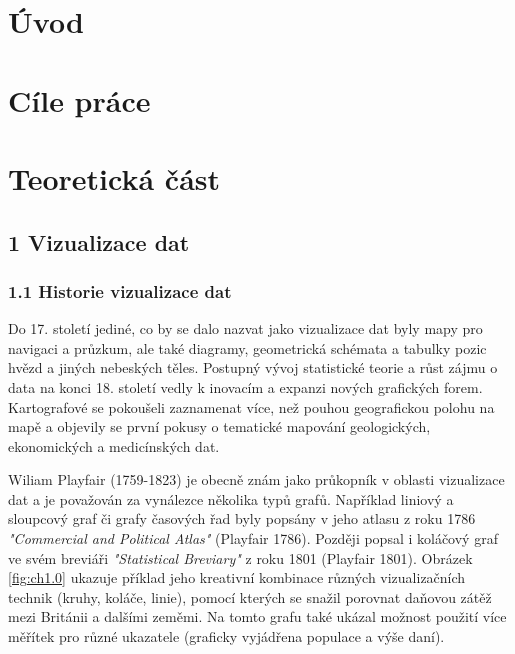\documentclass[12pt,]{article}
\title{}
\author{}
\date{}
\begin{document}


\tableofcontents

\newpage

\listoffigures
\listoftables

\newpage

\section{Úvod}\label{uvod}

\pagestyle{plain} \setcounter{page}{1}

\newpage

\section{Cíle práce}\label{cile-prace}

\newpage

\section*{Teoretická část}\label{teoreticka-cast}

\subsection{1 Vizualizace dat}\label{vizualizace-dat}

\subsubsection{1.1 Historie vizualizace
dat}\label{historie-vizualizace-dat}

\qquad Do 17. století jediné, co by se dalo nazvat jako vizualizace dat
byly mapy pro navigaci a průzkum, ale také diagramy, geometrická
schémata a tabulky pozic hvězd a jiných nebeských těles. Postupný vývoj
statistické teorie a růst zájmu o data na konci 18. století vedly k
inovacím a expanzi nových grafických forem. Kartografové se pokoušeli
zaznamenat více, než pouhou geografickou polohu na mapě a objevily se
první pokusy o tematické mapování geologických, ekonomických a
medicínských dat.

\qquad Wiliam Playfair (1759-1823) je obecně znám jako průkopník v
oblasti vizualizace dat a je považován za vynálezce několika typů grafů.
Například liniový a sloupcový graf či grafy časových řad byly popsány v
jeho atlasu z roku 1786 \textit{"Commercial and Political Atlas"}
(Playfair 1786). Později popsal i koláčový graf ve svém breviáři
\textit{"Statistical Breviary"} z roku 1801 (Playfair 1801). Obrázek
\ref{fig:ch1.0} ukazuje příklad jeho kreativní kombinace různých
vizualizačních technik (kruhy, koláče, linie), pomocí kterých se snažil
porovnat daňovou zátěž mezi Británii a dalšími zeměmi. Na tomto grafu
také ukázal možnost použití více měřítek pro různé ukazatele (graficky
vyjádřena populace a výše daní).
\end{document}

